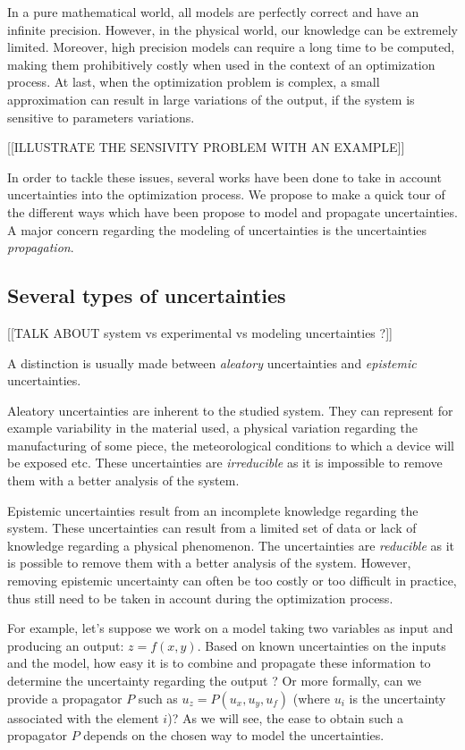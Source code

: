 In a pure mathematical world, all models are perfectly correct and have an infinite precision. However, in the physical world, our knowledge can be extremely limited. Moreover, high precision models can require a long time to be computed, making them prohibitively costly when used in the context of an optimization process. At last, when the optimization problem is complex, a small approximation can result in large variations of the output, if the system is sensitive to parameters variations.

[[ILLUSTRATE THE SENSIVITY PROBLEM WITH AN EXAMPLE]]

In order to tackle these issues, several works have been done to take in account uncertainties into the optimization process. We propose to make a quick tour of the different ways which have been propose to model and propagate uncertainties.
A major concern regarding the modeling of uncertainties is the uncertainties \emph{propagation}. 

\subsection{Several types of uncertainties}

[[TALK ABOUT system vs experimental vs modeling uncertainties ?]]

A distinction is usually made between \emph{aleatory} uncertainties and \emph{epistemic} uncertainties.

Aleatory uncertainties are inherent to the studied system. They can represent for example variability in the material used, a physical variation regarding the manufacturing of some piece, the meteorological conditions to which a device will be exposed etc.
These uncertainties are \emph{irreducible} as it is impossible to remove them with a better analysis of the system.

Epistemic uncertainties result from an incomplete knowledge regarding the system. These uncertainties can result from a limited set of data or lack of knowledge regarding a physical phenomenon.
The uncertainties are \emph{reducible} as it is possible to remove them with a better analysis of the system. However, removing epistemic uncertainty can often be too costly or too difficult in practice, thus still need to be taken in account during the optimization process.

For example, let's suppose we work on a model taking two variables as input and producing an output: $z=f(x,y)$.
Based on known uncertainties on the inputs and the model, how easy it is to combine and propagate these information to determine the uncertainty regarding the output ? Or more formally, can we provide a propagator $P$ such as $u_z = P(u_x, u_y, u_f)$ (where $u_i$ is the uncertainty associated with the element $i$)? As we will see, the ease to obtain such a propagator $P$ depends on the chosen way to model the uncertainties.

